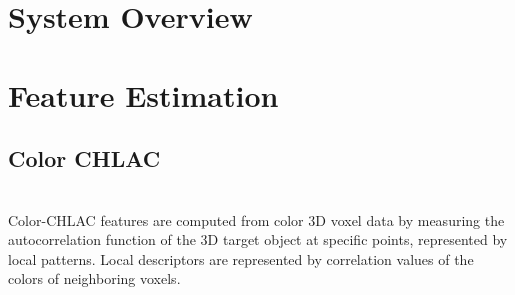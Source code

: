 \documentclass[conference]{sty/IEEEtran}
\begin{document}
\section{System Overview} 

\section{Feature Estimation}

\subsection{Color CHLAC}
\\
Color-CHLAC features are computed from color 3D voxel data by measuring 
    the autocorrelation function of the 3D target object at specific points, 
    represented by local patterns.
Local descriptors are represented by correlation values of the colors of neighboring voxels.
\end{document}
